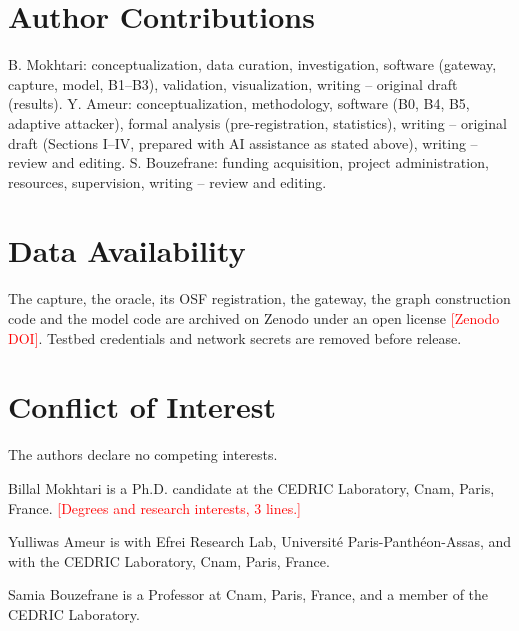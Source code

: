 \documentclass[journal]{IEEEtran}
\newcommand{\billal}[1]{\textcolor{red}{#1}}
\begin{document}
\section*{Author Contributions}
B. Mokhtari: conceptualization, data curation, investigation, software (gateway, capture, model, B1--B3), validation, visualization, writing -- original draft (results). Y. Ameur: conceptualization, methodology, software (B0, B4, B5, adaptive attacker), formal analysis (pre-registration, statistics), writing -- original draft (Sections I--IV, prepared with AI assistance as stated above), writing -- review and editing. S. Bouzefrane: funding acquisition, project administration, resources, supervision, writing -- review and editing.

\section*{Data Availability}
The capture, the oracle, its OSF registration, the gateway, the graph construction code and the model code are archived on Zenodo under an open license \billal{[Zenodo DOI]}. Testbed credentials and network secrets are removed before release.

\section*{Conflict of Interest}
The authors declare no competing interests.




\begin{IEEEbiographynophoto}{Billal Mokhtari}
is a Ph.D. candidate at the CEDRIC Laboratory, Cnam, Paris, France. \billal{[Degrees and research interests, 3 lines.]}
\end{IEEEbiographynophoto}
\begin{IEEEbiographynophoto}{Yulliwas Ameur}
is with Efrei Research Lab, Université Paris-Panthéon-Assas, and with the CEDRIC Laboratory, Cnam, Paris, France.
\end{IEEEbiographynophoto}
\begin{IEEEbiographynophoto}{Samia Bouzefrane}
is a Professor at Cnam, Paris, France, and a member of the CEDRIC Laboratory.
\end{IEEEbiographynophoto}
\end{document}
